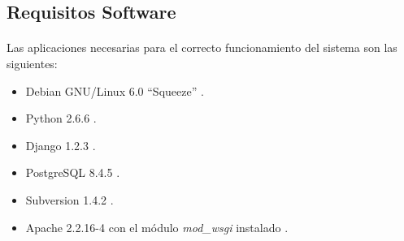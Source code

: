 \subsection{Requisitos Software}

  \paragraph{}Las aplicaciones necesarias para el correcto funcionamiento del
  sistema son las siguientes:

  \begin{itemize}
   \item Debian GNU/Linux 6.0 ``Squeeze'' \cite{debian}.
   \item Python 2.6.6 \cite{python}.
   \item Django 1.2.3 \cite{django}.
   \item PostgreSQL 8.4.5 \cite{postgresql}.
   \item Subversion 1.4.2 \cite{subversion}.
   \item Apache 2.2.16-4 con el módulo \textit{mod\_wsgi} instalado
   \cite{apache}.
  \end{itemize}
